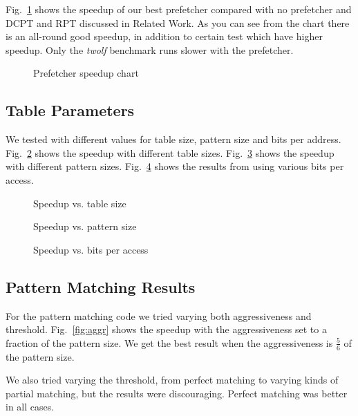 Fig.~\ref{fig:prefetcher_speedup} shows the speedup of our best prefetcher
compared with no prefetcher and DCPT and RPT discussed in Related Work.
As you can see from the
chart there is an all-round good speedup, in addition to certain test which
have higher speedup. Only the \emph{twolf} benchmark runs slower with the
prefetcher.

\begin{figure}
	
	\caption{Prefetcher speedup chart}
	\label{fig:prefetcher_speedup}
\end{figure}

\subsection{Table Parameters}
We tested with different values for table size, pattern size and bits per address.
Fig.~\ref{fig:table_size_chart} shows the speedup with different table sizes.
Fig.~\ref{fig:pattern_size} shows the speedup with different pattern sizes.
Fig.~\ref{fig:bits} shows the results from using various bits per access.

\begin{figure}
	
	\caption{Speedup vs. table size}
	\label{fig:table_size_chart}
\end{figure}

\begin{figure}
	
	\caption{Speedup vs. pattern size}
	\label{fig:pattern_size}
\end{figure}

\begin{figure}
	
	\caption{Speedup vs. bits per access}
	\label{fig:bits}
\end{figure}

\subsection{Pattern Matching Results}
For the pattern matching code we tried varying both aggressiveness and
threshold. Fig.~\ref{fig:aggr} shows the speedup with the aggressiveness set to
a fraction of the pattern size. We get the best result when the aggressiveness
is $\frac{5}{6}$ of the pattern size.

We also tried varying the threshold, from perfect matching to varying kinds of
partial matching, but the results were discouraging. Perfect matching was
better in all cases.

